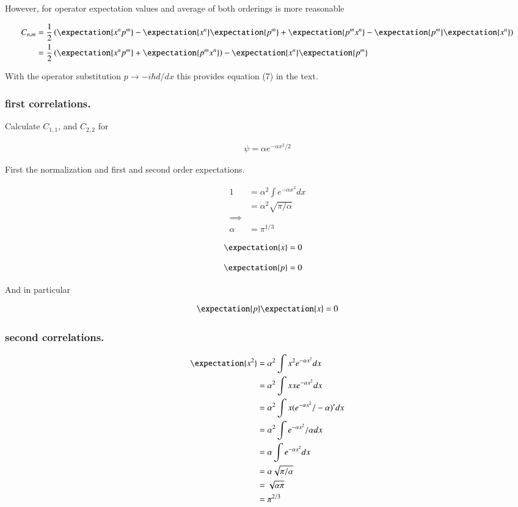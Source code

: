 However, for operator expectation values and average of both orderings is more reasonable

\begin{align*}
C_{n,m}
&= \inv{2} \left( 
\expectation{x^n p^m} - \expectation{x^n}\expectation{p^m} 
+ \expectation{p^m x^n} - \expectation{p^m}\expectation{x^n} 
\right) \\
&= \inv{2} \left( \expectation{x^n p^m} + \expectation{p^m x^n} \right) - \expectation{x^n}\expectation{p^m} 
\end{align*}

With the operator substitution $p \rightarrow -i \hbar d/dx$ this provides equation (7) in the text.

\subsubsection{first correlations. }

Calculate $C_{1,1}$, and $C_{2,2}$ for 

\begin{align*}
\psi = \alpha e^{-\alpha x^2/2}
\end{align*}

First the normalization and first and second order expectations.

\begin{align*}
1 
&= \alpha^2 \int e^{-\alpha x^2} dx \\
&= \alpha^2 \sqrt{\pi/\alpha} \\
\implies \\
\alpha &= \pi^{1/3}
\end{align*}

\begin{align*}
\expectation{x} &= 0
\end{align*}

\begin{align*}
\expectation{p} &= 0
\end{align*}

And in particular

\begin{align*}
\expectation{p} \expectation{x} &= 0 \\
\end{align*}

\subsubsection{second correlations. }

\begin{align*}
\expectation{x^2} 
&= \alpha^2 \int x^2 e^{-\alpha x^2} dx \\
&= \alpha^2 \int x x e^{-\alpha x^2} dx \\
&= \alpha^2 \int x (e^{-\alpha x^2}/-\alpha)' dx \\
&= \alpha^2 \int e^{-\alpha x^2}/\alpha dx \\
&= \alpha \int e^{-\alpha x^2} dx \\
&= \alpha \sqrt{\pi/\alpha} \\
&= \sqrt{\alpha \pi} \\
&= \pi^{2/3} \\
\end{align*}

